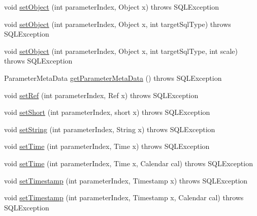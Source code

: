 \begin{DoxyCompactItemize}
void \mbox{\hyperlink{classcom_1_1mysql_1_1cj_1_1jdbc_1_1_prepared_statement_wrapper_a6a2447e4ec6d2fdaebc7f2999afcb208}{set\+Object}} (int parameter\+Index, Object x)  throws S\+Q\+L\+Exception 
\item 
void \mbox{\hyperlink{classcom_1_1mysql_1_1cj_1_1jdbc_1_1_prepared_statement_wrapper_aba602ff42f96c3e0dc7d8f37c070a1ed}{set\+Object}} (int parameter\+Index, Object x, int target\+Sql\+Type)  throws S\+Q\+L\+Exception 
\item 
void \mbox{\hyperlink{classcom_1_1mysql_1_1cj_1_1jdbc_1_1_prepared_statement_wrapper_a73032c272bd4067076ef522ae21db13e}{set\+Object}} (int parameter\+Index, Object x, int target\+Sql\+Type, int scale)  throws S\+Q\+L\+Exception 
\item 
Parameter\+Meta\+Data \mbox{\hyperlink{classcom_1_1mysql_1_1cj_1_1jdbc_1_1_prepared_statement_wrapper_a29b6b777e1129b87c63a81560f39f7a7}{get\+Parameter\+Meta\+Data}} ()  throws S\+Q\+L\+Exception 
\item 
void \mbox{\hyperlink{classcom_1_1mysql_1_1cj_1_1jdbc_1_1_prepared_statement_wrapper_aecf41df11df7d316b8f1d4fc00b67bb2}{set\+Ref}} (int parameter\+Index, Ref x)  throws S\+Q\+L\+Exception 
\item 
void \mbox{\hyperlink{classcom_1_1mysql_1_1cj_1_1jdbc_1_1_prepared_statement_wrapper_af032e75fac29b62869607b360040483d}{set\+Short}} (int parameter\+Index, short x)  throws S\+Q\+L\+Exception 
\item 
void \mbox{\hyperlink{classcom_1_1mysql_1_1cj_1_1jdbc_1_1_prepared_statement_wrapper_ae97747fc89b30ecaed9d390f6204cc97}{set\+String}} (int parameter\+Index, String x)  throws S\+Q\+L\+Exception 
\item 
void \mbox{\hyperlink{classcom_1_1mysql_1_1cj_1_1jdbc_1_1_prepared_statement_wrapper_a76e610d26d131045878903c575bb363b}{set\+Time}} (int parameter\+Index, Time x)  throws S\+Q\+L\+Exception 
\item 
void \mbox{\hyperlink{classcom_1_1mysql_1_1cj_1_1jdbc_1_1_prepared_statement_wrapper_ad827fffb5931fde21e8c3d10cc8866f4}{set\+Time}} (int parameter\+Index, Time x, Calendar cal)  throws S\+Q\+L\+Exception 
\item 
void \mbox{\hyperlink{classcom_1_1mysql_1_1cj_1_1jdbc_1_1_prepared_statement_wrapper_a5a1ef11d128f571e85f1387f960734d1}{set\+Timestamp}} (int parameter\+Index, Timestamp x)  throws S\+Q\+L\+Exception 
\item 
void \mbox{\hyperlink{classcom_1_1mysql_1_1cj_1_1jdbc_1_1_prepared_statement_wrapper_ab77a99d6d1ca90d7322b0d06ed3ecbc2}{set\+Timestamp}} (int parameter\+Index, Timestamp x, Calendar cal)  throws S\+Q\+L\+Exception 

\end{DoxyCompactItemize}
